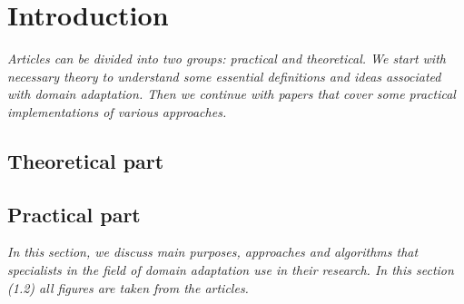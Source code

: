 \section{Introduction} \label{section: introduction}

\emph{Articles can be divided into two groups: practical and theoretical. We start with necessary theory to understand some essential definitions and ideas associated with domain adaptation. Then we continue with papers that cover some practical implementations of various approaches.}\\

\subsection{Theoretical part}


\subsection{Practical part}

\textit{In this section, we discuss main purposes, approaches and algorithms that specialists in the field of domain adaptation use in their research. In this section (1.2) all figures are taken from the articles.}\\















